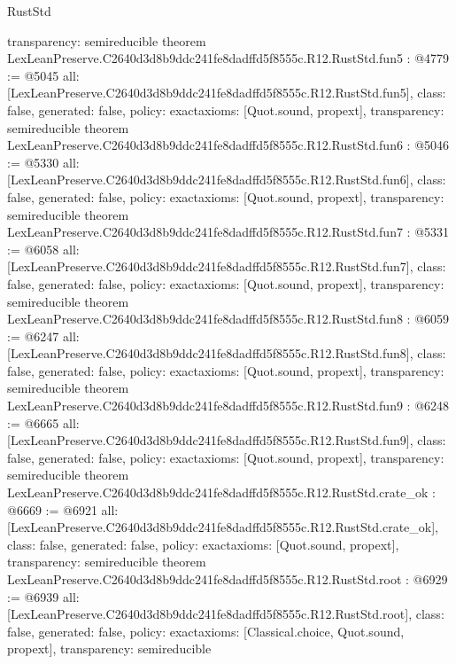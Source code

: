 \begin{lexlean}{RustStd}
\begin{coremodule}
{  transparency: semireducible
}
theorem LexLeanPreserve.C2640d3d8b9ddc241fe8dadffd5f8555c.R12.RustStd.fun5 : @4779 := @5045 {
  all: [LexLeanPreserve.C2640d3d8b9ddc241fe8dadffd5f8555c.R12.RustStd.fun5],
  class: false,
  generated: false,
  policy: exact{axioms: [Quot.sound, propext]},
  transparency: semireducible
}
theorem LexLeanPreserve.C2640d3d8b9ddc241fe8dadffd5f8555c.R12.RustStd.fun6 : @5046 := @5330 {
  all: [LexLeanPreserve.C2640d3d8b9ddc241fe8dadffd5f8555c.R12.RustStd.fun6],
  class: false,
  generated: false,
  policy: exact{axioms: [Quot.sound, propext]},
  transparency: semireducible
}
theorem LexLeanPreserve.C2640d3d8b9ddc241fe8dadffd5f8555c.R12.RustStd.fun7 : @5331 := @6058 {
  all: [LexLeanPreserve.C2640d3d8b9ddc241fe8dadffd5f8555c.R12.RustStd.fun7],
  class: false,
  generated: false,
  policy: exact{axioms: [Quot.sound, propext]},
  transparency: semireducible
}
theorem LexLeanPreserve.C2640d3d8b9ddc241fe8dadffd5f8555c.R12.RustStd.fun8 : @6059 := @6247 {
  all: [LexLeanPreserve.C2640d3d8b9ddc241fe8dadffd5f8555c.R12.RustStd.fun8],
  class: false,
  generated: false,
  policy: exact{axioms: [Quot.sound, propext]},
  transparency: semireducible
}
theorem LexLeanPreserve.C2640d3d8b9ddc241fe8dadffd5f8555c.R12.RustStd.fun9 : @6248 := @6665 {
  all: [LexLeanPreserve.C2640d3d8b9ddc241fe8dadffd5f8555c.R12.RustStd.fun9],
  class: false,
  generated: false,
  policy: exact{axioms: [Quot.sound, propext]},
  transparency: semireducible
}
theorem LexLeanPreserve.C2640d3d8b9ddc241fe8dadffd5f8555c.R12.RustStd.crate_ok : @6669 := @6921 {
  all: [LexLeanPreserve.C2640d3d8b9ddc241fe8dadffd5f8555c.R12.RustStd.crate_ok],
  class: false,
  generated: false,
  policy: exact{axioms: [Quot.sound, propext]},
  transparency: semireducible
}
theorem LexLeanPreserve.C2640d3d8b9ddc241fe8dadffd5f8555c.R12.RustStd.root : @6929 := @6939 {
  all: [LexLeanPreserve.C2640d3d8b9ddc241fe8dadffd5f8555c.R12.RustStd.root],
  class: false,
  generated: false,
  policy: exact{axioms: [Classical.choice, Quot.sound, propext]},
  transparency: semireducible
}


\end{coremodule}
\end{lexlean}
